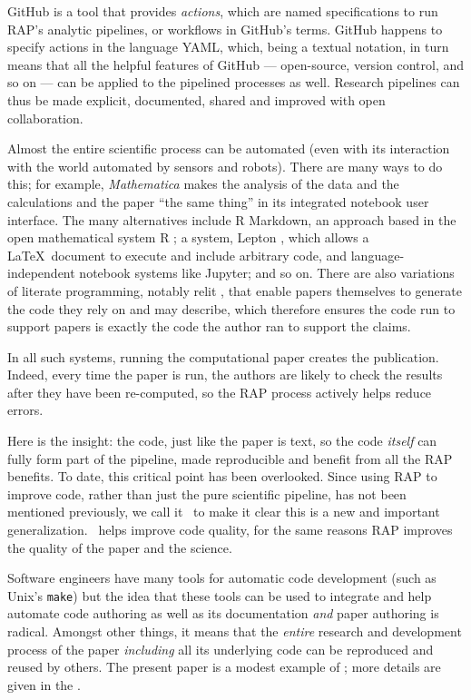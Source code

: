 \documentclass{comjnl}
\begin{document}
GitHub is a tool that provides \emph{actions\/}, which are named specifications to run RAP's analytic pipelines, or workflows in GitHub's terms. GitHub happens to specify actions in the language YAML, which, being a textual notation, in turn means that all the helpful features of GitHub --- open-source, version control, and so on --- can be applied to the pipelined processes as well. Research pipelines can thus be made explicit, documented, shared and improved with open collaboration.

Almost the entire scientific process can be automated (even with its interaction with the world automated by sensors and robots). There are many ways to do this; for example, \emph{Mathematica\/} makes the analysis of the data and the calculations and the paper ``the same thing'' in its integrated notebook user interface. The many alternatives include R Markdown, an approach based in the open mathematical system R \cite{RMarkdown}; a system, Lepton \cite{lepton}, which allows a \LaTeX\ document to execute and include arbitrary code, and language-independent notebook systems like Jupyter; and so on. There are also variations of literate programming, notably relit \cite{relit}, that enable papers themselves to generate the code they rely on and may describe, which therefore ensures the code run to support papers is exactly the code the author ran to support the claims. 

In all such systems, running the computational paper creates the publication. Indeed, every time the paper is run, the authors are likely to check the results after they have been re-computed, so the RAP process actively helps reduce errors. 

Here is the insight: the code, just like the paper is text, so the code \emph{itself\/} can fully form part of the pipeline, made reproducible and benefit from all the RAP benefits. To date, this critical point has been overlooked. Since using RAP to improve code, rather than just the pure scientific pipeline, has not been mentioned previously, we call it \RAPstar\ to make it clear this is a new and important generalization. \RAPstar\ helps improve code quality, for the same reasons RAP improves the quality of the paper and the science. 

Software engineers have many tools for automatic code development (such as Unix's \texttt{make}) but the idea that these tools can be used to integrate and help automate code authoring as well as its documentation \emph{and\/} paper authoring is radical. Amongst other things, it means that the \emph{entire\/} research and development process of the paper \emph{including\/} all its underlying code can be reproduced and reused by others. The present paper is a modest example of \RAPstarp; more details are given in the \supplement. 
\end{document}
